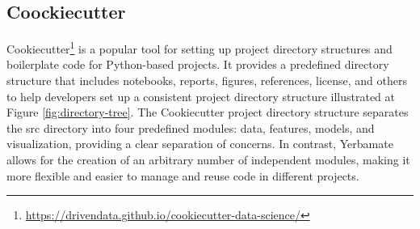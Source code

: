 \subsection{Coockiecutter}
Cookiecutter\footnote{\url{https://drivendata.github.io/cookiecutter-data-science/}} is a popular tool for setting up project directory structures and boilerplate code for Python-based projects. It provides a predefined directory structure that includes notebooks, reports, figures, references, license, and others to help developers set up a consistent project directory structure illustrated at Figure \ref{fig:directory-tree}. The Cookiecutter project directory structure separates the src directory into four predefined modules: data, features, models, and visualization, providing a clear separation of concerns. In contrast, Yerbamate allows for the creation of an arbitrary number of independent modules, making it more flexible and easier to manage and reuse code in different projects. 


